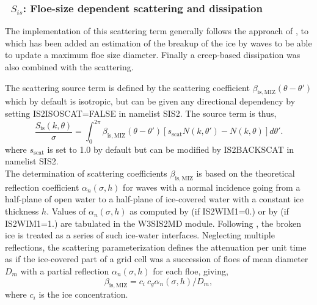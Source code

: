\vsssub
\subsubsection{~$S_{is}$: Floe-size dependent scattering and dissipation} \label{sec:IS2}
\vsssub



The implementation of this scattering term generally 
follows the approach of \cite{art:MM06}, to which has been added an estimation of the breakup of the ice 
by waves to be able to update a maximum floe size diameter. Finally a creep-based dissipation was also 
combined with the scattering.  


The scattering source term is defined by the scattering coefficient $\beta_{\mathrm{is},\mathrm{MIZ}}(\theta-\theta')$ which by default is isotropic, but can be given any directional dependency by setting {\code IS2ISOSCAT=FALSE} in namelist {\F SIS2}. The source term is thus,
\begin{equation}
 \frac{S_{\mathrm{is}}(k,\theta)}{\sigma} =  \int_0^{2\pi}\beta_{\mathrm{is},\mathrm{MIZ}}(\theta-\theta') [s_\mathrm{scat}  N(k,\theta')-N(k,\theta)] d\theta'  .
 \end{equation}
where $s_\mathrm{scat}$ is set to 1.0 by default but can be modified by 
{\code IS2BACKSCAT} in namelist {\F SIS2}. \\


The determination of scattering coefficients  $\beta_{\mathrm{is},\mathrm{MIZ}}$ is based on the theoretical 
reflection coefficient $\alpha_n(\sigma,h)$
for waves with a normal incidence going from a half-plane of open water to a half-plane of ice-covered water with a 
constant ice thickness $h$.  
Values of $\alpha_n(\sigma,h)$ as computed by \cite{art:KM08}
 (if {\code IS2WIM1=0.}) or by \cite{art:Ben12} (if {\code IS2WIM1=1.})  are tabulated 
in the {\code W3SIS2MD} module. Following \cite{art:Dea11}, the broken ice is treated as a series of 
such ice-water interfaces. Neglecting multiple reflections, the scattering parameterization defines the attenuation 
per unit time as if the ice-covered part of a grid cell was a succession of floes of mean diameter $D_{m}$ with a partial 
reflection $\alpha_n(\sigma,h)$ for each floe, giving, 
\begin{equation}
\beta_{\mathrm{is},\mathrm{MIZ}}=c_i~c_g \alpha_n(\sigma,h) / D_{m},
 \end{equation}
where $c_i$ is the ice concentration. \\
 

